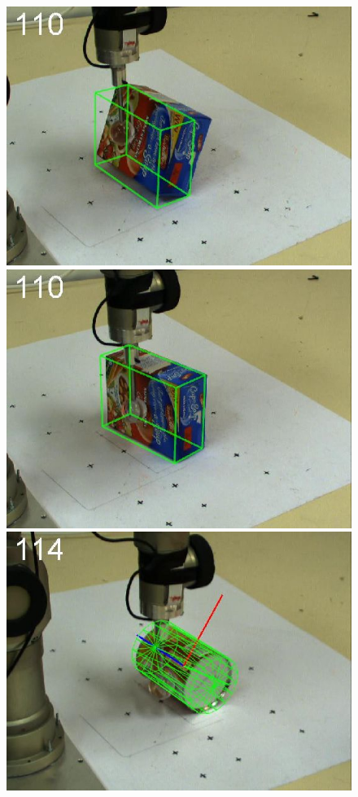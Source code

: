 \begin{figure}[htbp]
{\includegraphics[width=\imgAXwid]{images/A2_LWPR1_399_2}
\includegraphics[width=\imgAXwid]{images/A2_2exp_87_2}
\includegraphics[width=\imgAXwid]{images/A3_2exp_39_2}
}
\end{figure}

